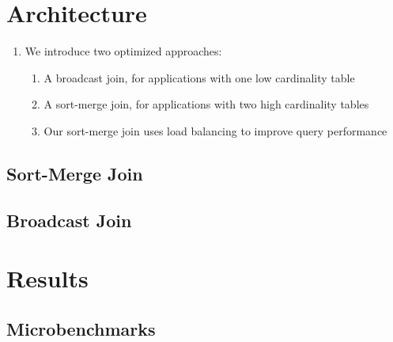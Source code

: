\documentclass{vldb}
\begin{document}
\section{Architecture}
\label{sec:architecture}

\begin{enumerate}
\item We introduce two optimized approaches:
\begin{enumerate}
\item A broadcast join, for applications with one low cardinality table
\item A sort-merge join, for applications with two high cardinality tables
\item Our sort-merge join uses load balancing to improve query performance
\end{enumerate}
\end{enumerate}

\subsection{Sort-Merge Join}
\label{sec:sort-merge}

\subsection{Broadcast Join}
\label{sec:broadcast}

\section{Results}
\label{sec:results}

\subsection{Microbenchmarks}
\label{sec:microbenchmarks}
\end{document}
